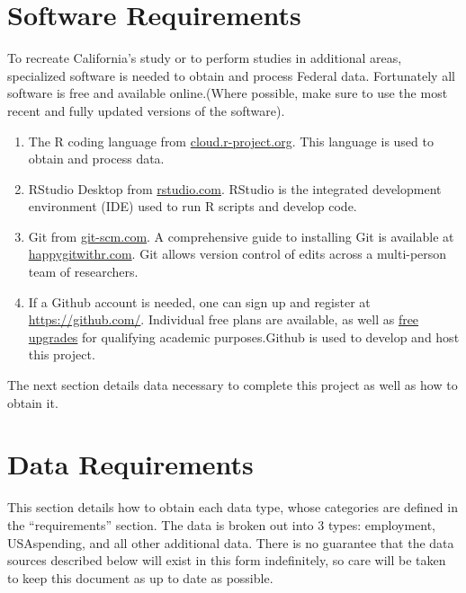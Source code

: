 \documentclass[
]{book}
\begin{document}
\hypertarget{software-requirements}{%
\chapter{Software Requirements}\label{software-requirements}}

To recreate California's study or to perform studies in additional areas, specialized software is needed to obtain and process Federal data. Fortunately all software is free and available online.(Where possible, make sure to use the most recent and fully updated versions of the software).

\begin{enumerate}
\def\labelenumi{\arabic{enumi}.}
\item
  The R coding language from \href{https://cloud.r-project.org/}{cloud.r-project.org}. This language is used to obtain and process data.
\item
  RStudio Desktop from \href{https://rstudio.com/products/rstudio/download/\#download}{rstudio.com}. RStudio is the integrated development environment (IDE) used to run R scripts and develop code.
\item
  Git from \href{https://git-scm.com/downloads}{git-scm.com}. A comprehensive guide to installing Git is available at \href{https://happygitwithr.com/install-git.html}{happygitwithr.com}. Git allows version control of edits across a multi-person team of researchers.
\item
  If a Github account is needed, one can sign up and register at \url{https://github.com/}. Individual free plans are available, as well as \href{https://help.github.com/en/articles/applying-for-an-educator-or-researcher-discount}{free upgrades} for qualifying academic purposes.Github is used to develop and host this project.
\end{enumerate}

The next section details data necessary to complete this project as well as how to obtain it.

\hypertarget{data-requirements}{%
\chapter{Data Requirements}\label{data-requirements}}

This section details how to obtain each data type, whose categories are defined in the ``requirements'' section. The data is broken out into 3 types: employment, USAspending, and all other additional data. There is no guarantee that the data sources described below will exist in this form indefinitely, so care will be taken to keep this document as up to date as possible.
\end{document}
